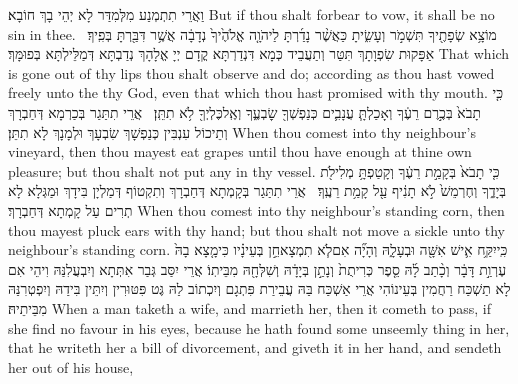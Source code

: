 {וַאֲרֵי תִתְמְנַע מִלְּמִדַּר לָא יְהֵי בָךְ חוֹבָא׃}
{But if thou shalt forbear to vow, it shall be no sin in thee.}{}
{מוֹצָ֥א שְׂפָתֶ֖יךָ תִּשְׁמֹ֣ר וְעָשִׂ֑יתָ כַּאֲשֶׁ֨ר נָדַ֜רְתָּ לַיהֹוָ֤ה אֱלֹהֶ֙יךָ֙ נְדָבָ֔ה אֲשֶׁ֥ר דִּבַּ֖רְתָּ בְּפִֽיךָ׃ \setuma }
{אַפָּקוּת שִׂפְוָתָךְ תִּטַּר וְתַעֲבֵיד כְּמָא דִּנְדַרְתָּא קֳדָם יְיָ אֱלָהָךְ נְדַבְתָּא דְּמַלֵּילְתָּא בְּפוּמָּךְ׃}
{That which is gone out of thy lips thou shalt observe and do; according as thou hast vowed freely unto the \lord\space thy God, even that which thou hast promised with thy mouth.}{}
{כִּ֤י תָבֹא֙ בְּכֶ֣רֶם רֵעֶ֔ךָ וְאָכַלְתָּ֧ עֲנָבִ֛ים כְּנַפְשְׁךָ֖ שׇׂבְעֶ֑ךָ וְאֶֽל\maqqaf כֶּלְיְךָ֖ לֹ֥א תִתֵּֽן׃ \setuma }
{אֲרֵי תִתַּגַר בְּכַרְמָא דְּחַבְרָךְ וְתֵיכוֹל עִנְבִּין כְּנַפְשָׁךְ שִׂבְעָךְ וּלְמָנָךְ לָא תִתֵּן׃}
{When thou comest into thy neighbour’s vineyard, then thou mayest eat grapes until thou have enough at thine own pleasure; but thou shalt not put any in thy vessel.}{}
{כִּ֤י תָבֹא֙ בְּקָמַ֣ת רֵעֶ֔ךָ וְקָטַפְתָּ֥ מְלִילֹ֖ת בְּיָדֶ֑ךָ וְחֶרְמֵשׁ֙ לֹ֣א תָנִ֔יף עַ֖ל קָמַ֥ת רֵעֶֽךָ׃ \setuma }
{אֲרֵי תִתַּגַר בְּקָמְתָא דְּחַבְרָךְ וְתִקְטוֹף דְּמַלְיָן בִּידָךְ וּמַגְּלָא לָא תְרִים עַל קָמְתָא דְּחַבְרָךְ׃}
{When thou comest into thy neighbour’s standing corn, then thou mayest pluck ears with thy hand; but thou shalt not move a sickle unto thy neighbour’s standing corn.}{}
\newperek
{}%
{כִּֽי\maqqaf יִקַּ֥ח אִ֛ישׁ אִשָּׁ֖ה וּבְעָלָ֑הּ וְהָיָ֞ה אִם\maqqaf לֹ֧א תִמְצָא\maqqaf חֵ֣ן בְּעֵינָ֗יו כִּי\maqqaf מָ֤צָא בָהּ֙ עֶרְוַ֣ת דָּבָ֔ר וְכָ֨תַב לָ֜הּ סֵ֤פֶר כְּרִיתֻת֙ וְנָתַ֣ן בְּיָדָ֔הּ וְשִׁלְּחָ֖הּ מִבֵּיתֽוֹ׃}
{אֲרֵי יִסַּב גְּבַר אִתְּתָא וְיִבְעֲלִנַּהּ וִיהֵי אִם לָא תַשְׁכַּח רַחֲמִין בְּעֵינוֹהִי אֲרֵי אַשְׁכַּח בַּהּ עֲבֵירַת פִּתְגָם וְיִכְתוֹב לַהּ גֶּט פִּטּוּרִין וְיִתֵּין בִּידַהּ וְיִפְטְרִנַּהּ מִבֵּיתֵיהּ׃}
{When a man taketh a wife, and marrieth her, then it cometh to pass, if she find no favour in his eyes, because he hath found some unseemly thing in her, that he writeth her a bill of divorcement, and giveth it in her hand, and sendeth her out of his house,}{}
